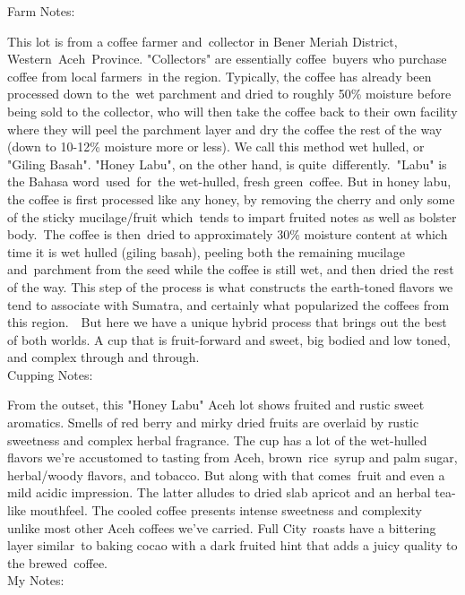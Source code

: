\documentclass[10pt,twoside,footinclude=true,headinclude=true]{scrbook} %
\newlength{\mysize}
\newcommand{\myfontsize}[1]{
  \setlength{\mysize}{#1pt}
  \fontsize{\mysize}{1.2\mysize}
  \selectfont
}
\begin{document}
\newpage
\vspace*{-2.2em}
\raggedright
\normalsize
Farm Notes: \\
\myfontsize{8}
This lot is from a coffee farmer and collector in Bener Meriah District, Western Aceh Province. "Collectors" are essentially coffee buyers who purchase coffee from local farmers in the region. Typically, the coffee has already been processed down to the wet parchment and dried to roughly 50\% moisture before being sold to the collector, who will then take the coffee back to their own facility where they will peel the parchment layer and dry the coffee the rest of the way (down to 10-12\% moisture more or less). We call this method wet hulled, or "Giling Basah". "Honey Labu", on the other hand, is quite differently. "Labu" is the Bahasa word used for the wet-hulled, fresh green coffee. But in honey labu, the coffee is first processed like any honey, by removing the cherry and only some of the sticky mucilage/fruit which tends to impart fruited notes as well as bolster body. The coffee is then dried to approximately 30\% moisture content at which time it is wet hulled (giling basah), peeling both the remaining mucilage and parchment from the seed while the coffee is still wet, and then dried the rest of the way. This step of the process is what constructs the earth-toned flavors we tend to associate with Sumatra, and certainly what popularized the coffees from this region.  But here we have a unique hybrid process that brings out the best of both worlds. A cup that is fruit-forward and sweet, big bodied and low toned, and complex through and through. \\
\medskip
\normalsize
Cupping Notes: \\
\myfontsize{8}
From the outset, this "Honey Labu" Aceh lot shows fruited and rustic sweet aromatics. Smells of red berry and mirky dried fruits are overlaid by rustic sweetness and complex herbal fragrance. The cup has a lot of the wet-hulled flavors we're accustomed to tasting from Aceh, brown rice syrup and palm sugar, herbal/woody flavors, and tobacco. But along with that comes fruit and even a mild acidic impression. The latter alludes to dried slab apricot and an herbal tea-like mouthfeel. The cooled coffee presents intense sweetness and complexity unlike most other Aceh coffees we've carried. Full City roasts have a bittering layer similar to baking cocao with a dark fruited hint that adds a juicy quality to the brewed coffee. 
  \\
\medskip
\normalsize
My Notes:
\end{document}
